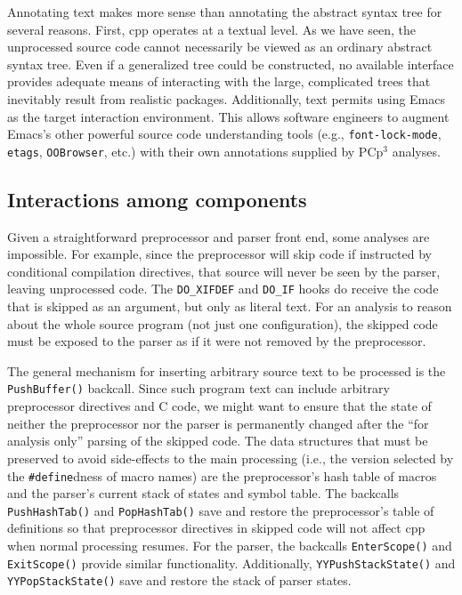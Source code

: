 \documentclass{article}
\newcommand{\pcp}{\mbox{\textsf{PCp}$^3$}}
\newcommand{\Cpp}{\mbox{\textsf{cpp}}}
\newcommand{\C}{\mbox{C}}
\newcommand{\ppd}[1]{\texttt{\##1}}
\newcommand{\ie}{i.e.,}
\newcommand{\eg}{e.g.,}
\newcommand{\etc}{etc}  %
\begin{document}
Annotating text makes more sense than annotating the abstract syntax
tree for several reasons.  First, \Cpp{} operates at a textual level.
As we have seen, the unprocessed source code cannot necessarily be
viewed as an ordinary abstract syntax tree.  Even if a generalized tree
could be constructed, no available interface provides adequate means
of interacting with the large, complicated trees that inevitably result
from realistic packages.
Additionally, text permits using Emacs as the target interaction
environment. This allows software engineers to augment Emacs's other
powerful source code understanding tools (\eg{} \texttt{font-lock-mode},
\texttt{etags}, \texttt{OOBrowser}, \etc{}.)  with their own annotations
supplied by \pcp{} analyses.


\subsection{Interactions among components}

Given a straightforward preprocessor and parser front end, some analyses
are impossible.  For example, since the preprocessor will skip code if
instructed by conditional compilation directives, that source will never
be seen by the parser, leaving unprocessed code.  The
\texttt{DO\_XIFDEF} and \texttt{DO\_IF} hooks do receive the code that is
skipped as an argument, but only as literal text.  For an analysis to
reason about the whole source program (not just one configuration), the
skipped code must be exposed to the parser as if it were not removed by
the preprocessor.

The general mechanism for inserting arbitrary source text to be processed
is the \texttt{PushBuffer()} backcall.  Since such program text
can include arbitrary preprocessor directives and \C{} code, we might want to
ensure that the state of neither the preprocessor nor the parser is
permanently changed after the ``for analysis only'' parsing of the
skipped code.  The data structures that must be preserved to avoid
side-effects to the main processing (\ie{} the version selected by the
\ppd{define}dness of macro names) are the
preprocessor's hash table of macros and the parser's current stack of
states and symbol table.  The backcalls \texttt{PushHashTab()} and
\texttt{PopHashTab()} save and restore the preprocessor's table of
definitions so that preprocessor directives in skipped code will not
affect \Cpp{} when normal processing resumes.  For the parser, the
backcalls \texttt{EnterScope()} and \texttt{ExitScope()} provide similar
functionality.  Additionally, \texttt{YYPushStackState()} and
\texttt{YYPopStackState()} save and restore the stack of parser states.
\end{document}
